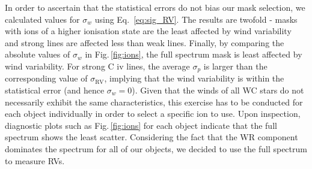 
In order to ascertain that the statistical errors do not bias our mask selection, we calculated values for $\sigma_w$ using Eq.~\ref{eq:sig_RV}. The results are twofold - masks with ions of a higher ionisation state are the least affected by wind variability and strong lines are affected less than weak lines. Finally, by comparing the absolute values of $\sigma_w$ in Fig.\,\ref{fig:ions}, the full spectrum mask is least affected by wind variability. For strong C {\sc iv} lines, the average $\sigma_p$ is larger than the corresponding value of $\sigma_\textrm{RV}$, implying that the wind variability is within the statistical error (and hence $\sigma_w=0$). Given that the winds of all WC stars do not necessarily exhibit the same characteristics, this exercise has to be conducted for each object individually in order to select a specific ion to use. Upon inspection, diagnostic plots such as Fig.\,\ref{fig:ions} for each object indicate that the full spectrum shows the least scatter. Considering the fact that the WR component dominates the spectrum for all of our objects, we decided to use the full spectrum to measure RVs.

